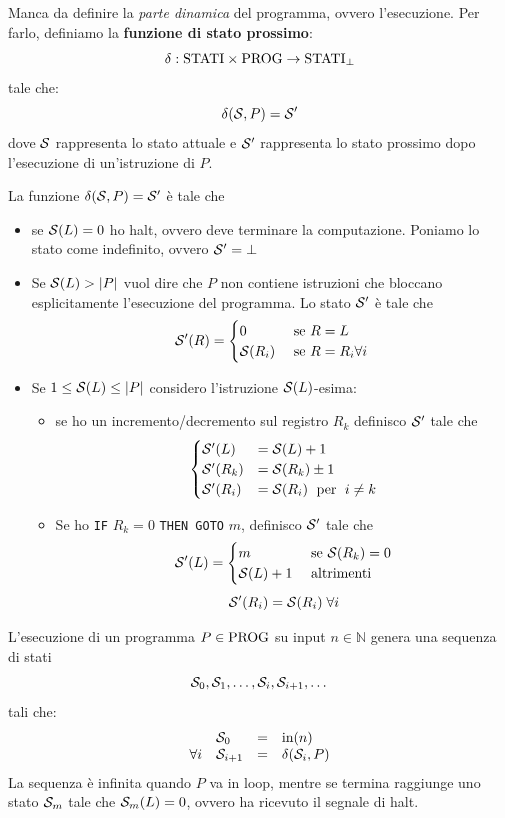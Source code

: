 Manca da definire la \textit{parte dinamica} del programma, ovvero l'esecuzione. Per farlo, definiamo la \textbf{funzione di stato prossimo}: 
$$ \delta : \text{STATI} \times \text{PROG} \rightarrow \text{STATI}_\bot $$
tale che:
$$ \delta (\mathcal{S},P) = \mathcal{S}' $$
dove $\mathcal{S}$ rappresenta lo stato attuale e $\mathcal{S}'$ rappresenta lo stato prossimo dopo l'esecuzione di un'istruzione di $P$.

La funzione $\delta (\mathcal{S}, P) = \mathcal{S}'$ è tale che
\begin{itemize}
	\item se $\mathcal{S}(L) = 0$ ho halt, ovvero deve terminare la computazione. Poniamo lo stato come indefinito, ovvero $\mathcal{S}' = \bot$
	\item Se $\mathcal{S}(L)>|P|$ vuol dire che $P$ non contiene istruzioni che bloccano esplicitamente l'esecuzione del programma. Lo stato $\mathcal{S}'$ è tale che 
	$$ 
	\mathcal{S}'(R) = \begin{cases}
		0 & \text{ se } R = L \\
		\mathcal{S}(R_i) &\text{ se } R = R_i \forall i
	\end{cases}
	$$
	\item Se $1 \leq \mathcal{S}(L) \leq |P|$ considero l'istruzione $\mathcal{S}(L)$-esima:
	\begin{itemize}
		\item se ho un incremento/decremento sul registro $R_k$ definisco $\mathcal{S}'$ tale che 
		$$ 
		\begin{cases}
			\mathcal{S}'(L) & = \mathcal{S} (L) + 1\\
			\mathcal{S}'(R_k) & = \mathcal{S} (R_k) \pm 1\\
			\mathcal{S}'(R_i) & = \mathcal{S} (R_i) \; \text{ per } \; i \neq k \\
		\end{cases}
		$$
		\item Se ho \verb|IF| $R_k = 0$ \verb|THEN GOTO| $m$, definisco $\mathcal{S}'$ tale che
		$$ 
		\mathcal{S}' (L) = \begin{cases}
			m & \text{ se } \mathcal{S} (R_k) = 0 \\
			\mathcal{S} (L) + 1 & \text{ altrimenti}
		\end{cases}
		$$
		$$ \mathcal{S}' (R_i) = \mathcal{S} (R_i) \; \forall i $$
	\end{itemize}
\end{itemize}

L'esecuzione di un programma $P \in \text{PROG}$ su input $n \in \mathbb{N}$ genera una sequenza di stati 
$$ \mathcal{S}_0, \mathcal{S}_1, \dots, \mathcal{S}_i, \mathcal{S}_{i+1}, \dots $$
tali che:
$$
\begin{array}{l l c l}
	& \mathcal{S}_0 & = & \text{in}(n) \\
	\forall i & \mathcal{S}_{i+1} & = & \delta (\mathcal{S}_i,P) 
\end{array}
$$
La sequenza è infinita quando $P$ va in loop, mentre se termina raggiunge uno stato $\mathcal{S}_m$ tale che $\mathcal{S}_m (L) = 0$, ovvero ha ricevuto il segnale di halt.

